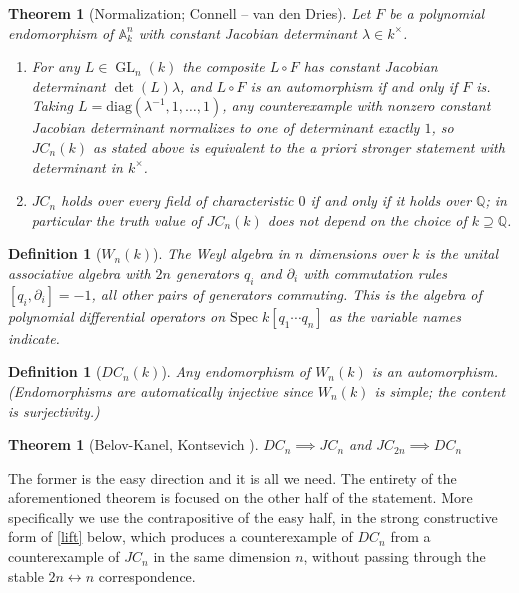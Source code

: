 \documentclass[11pt]{article}
\theoremstyle{change}
\newtheorem{definition}[equation]{Definition}
\newtheorem{theorem}[equation]{Theorem}
\theoremstyle{nonumberplain}
\numberwithin{equation}{section}
\newcommand\QQ{{\mathbb Q}}
\DeclareMathOperator{\GL}{GL}
\begin{document}
\begin{theorem}[Normalization; Connell -- van den Dries\label{vC}]
Let $F$ be a polynomial endomorphism of $\mathbb{A}^n_k$ with constant Jacobian determinant $\lambda \in k^\times$.
\begin{enumerate}
\item For any $L \in \GL_n(k)$ the composite $L \circ F$ has constant Jacobian determinant $\det(L)\lambda$, and $L \circ F$ is an automorphism if and only if $F$ is. Taking $L = \mathrm{diag}(\lambda^{-1}, 1, \dots, 1)$, any counterexample with nonzero constant Jacobian determinant normalizes to one of determinant exactly $1$, so $JC_n(k)$ as stated above is equivalent to the a priori stronger statement with determinant in $k^\times$.
\item \cite{CvdD} $JC_n$ holds over every field of characteristic $0$ if and only if it holds over $\QQ$; in particular the truth value of $JC_n(k)$ does not depend on the choice of $k \supseteq \QQ$.
\end{enumerate}
\end{theorem}

\begin{definition}[$W_n (k)$]
The Weyl algebra in $n$ dimensions over $k$ is the unital associative algebra with $2n$ generators $q_i$ and $\partial_i$ with commutation rules $[q_i, \partial_i] = -1$, all other pairs of generators commuting. This is the algebra of polynomial differential operators on $\text{Spec} \; k[q_1 \cdots q_n]$ as the variable names indicate.
\end{definition}

\begin{definition}[$DC_n (k)$]
Any endomorphism of $W_n (k)$ is an automorphism. (Endomorphisms are automatically injective since $W_n(k)$ is simple; the content is surjectivity.)
\end{definition}

\begin{theorem}[Belov-Kanel, Kontsevich \cite{BKK}]
$DC_n \implies JC_n$ and $JC_{2n} \implies DC_{n}$
\end{theorem}

The former is the easy direction and it is all we need. The entirety of the aforementioned theorem is focused on the other half of the statement. More specifically we use the contrapositive of the easy half, in the strong constructive form of \cref{lift} below, which produces a counterexample of $DC_n$ from a counterexample of $JC_n$ in the same dimension $n$, without passing through the stable $2n \leftrightarrow n$ correspondence.
\end{document}
